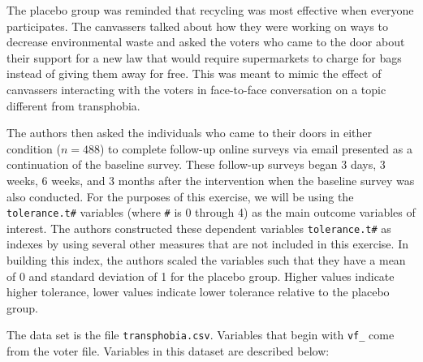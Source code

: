 \documentclass[]{article}
\begin{document}
The placebo group was reminded that recycling was most effective when
everyone participates. The canvassers talked about how they were working
on ways to decrease environmental waste and asked the voters who came to
the door about their support for a new law that would require
supermarkets to charge for bags instead of giving them away for free.
This was meant to mimic the effect of canvassers interacting with the
voters in face-to-face conversation on a topic different from
transphobia.

The authors then asked the individuals who came to their doors in either
condition ($n=488$) to complete follow-up online surveys via email
presented as a continuation of the baseline survey. These follow-up
surveys began 3 days, 3 weeks, 6 weeks, and 3 months after the
intervention when the baseline survey was also conducted. For the
purposes of this exercise, we will be using the \texttt{tolerance.t\#}
variables (where \texttt{\#} is 0 through 4) as the main outcome
variables of interest. The authors constructed these dependent variables
\texttt{tolerance.t\#} as indexes by using several other measures that
are not included in this exercise. In building this index, the authors
scaled the variables such that they have a mean of 0 and standard
deviation of 1 for the placebo group. Higher values indicate higher
tolerance, lower values indicate lower tolerance relative to the placebo
group.

The data set is the file \texttt{transphobia.csv}. Variables that begin
with \texttt{vf\_} come from the voter file. Variables in this dataset
are described below:
\end{document}
